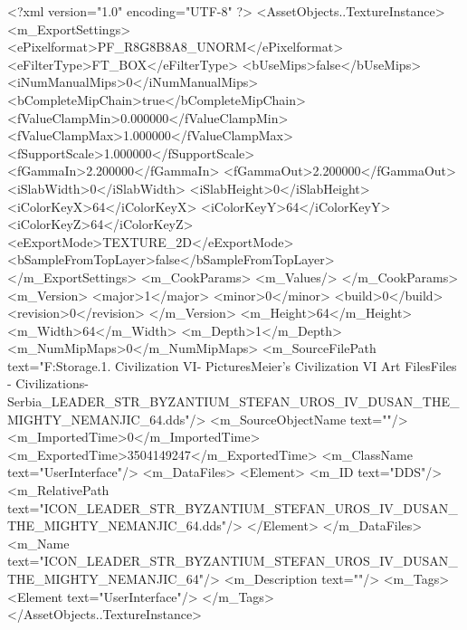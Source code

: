 <?xml version="1.0" encoding="UTF-8" ?>
<AssetObjects..TextureInstance>
	<m_ExportSettings>
		<ePixelformat>PF_R8G8B8A8_UNORM</ePixelformat>
		<eFilterType>FT_BOX</eFilterType>
		<bUseMips>false</bUseMips>
		<iNumManualMips>0</iNumManualMips>
		<bCompleteMipChain>true</bCompleteMipChain>
		<fValueClampMin>0.000000</fValueClampMin>
		<fValueClampMax>1.000000</fValueClampMax>
		<fSupportScale>1.000000</fSupportScale>
		<fGammaIn>2.200000</fGammaIn>
		<fGammaOut>2.200000</fGammaOut>
		<iSlabWidth>0</iSlabWidth>
		<iSlabHeight>0</iSlabHeight>
		<iColorKeyX>64</iColorKeyX>
		<iColorKeyY>64</iColorKeyY>
		<iColorKeyZ>64</iColorKeyZ>
		<eExportMode>TEXTURE_2D</eExportMode>
		<bSampleFromTopLayer>false</bSampleFromTopLayer>
	</m_ExportSettings>
	<m_CookParams>
		<m_Values/>
	</m_CookParams>
	<m_Version>
		<major>1</major>
		<minor>0</minor>
		<build>0</build>
		<revision>0</revision>
	</m_Version>
	<m_Height>64</m_Height>
	<m_Width>64</m_Width>
	<m_Depth>1</m_Depth>
	<m_NumMipMaps>0</m_NumMipMaps>
	<m_SourceFilePath text="F:\Mod Storage\2.1. Civilization VI\Mods\Archive - Pictures\Sid Meier's Civilization VI Art Files\Art Files - Civilizations\Civilization - Serbia\ICON_LEADER_STR_BYZANTIUM_STEFAN_UROS_IV_DUSAN_THE_MIGHTY_NEMANJIC_64.dds"/>
	<m_SourceObjectName text=""/>
	<m_ImportedTime>0</m_ImportedTime>
	<m_ExportedTime>3504149247</m_ExportedTime>
	<m_ClassName text="UserInterface"/>
	<m_DataFiles>
		<Element>
			<m_ID text="DDS"/>
			<m_RelativePath text="ICON_LEADER_STR_BYZANTIUM_STEFAN_UROS_IV_DUSAN_THE_MIGHTY_NEMANJIC_64.dds"/>
		</Element>
	</m_DataFiles>
	<m_Name text="ICON_LEADER_STR_BYZANTIUM_STEFAN_UROS_IV_DUSAN_THE_MIGHTY_NEMANJIC_64"/>
	<m_Description text=""/>
	<m_Tags>
		<Element text="UserInterface"/>
	</m_Tags>
</AssetObjects..TextureInstance>

